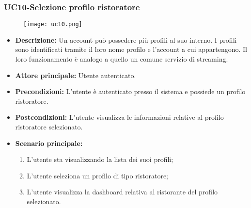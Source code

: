 \subsubsection{UC10-Selezione profilo ristoratore}
\begin{figure}[h] \texttt{[image: uc10.png]} \end{figure}
\begin{itemize}
\item \textbf{Descrizione:} Un account può possedere più profili al suo interno. I profili sono identificati tramite il loro nome profilo e l'account a cui appartengono. Il loro funzionamento è analogo a quello un comune servizio di streaming. %
\item \textbf{Attore principale:} Utente autenticato.
\item \textbf{Precondizioni:} L'utente è autenticato presso il sistema e possiede un profilo ristoratore.
\item \textbf{Postcondizioni:} L'utente visualizza le informazioni relative al profilo ristoratore selezionato.
\item \textbf{Scenario principale:}
\begin{enumerate}
    \item L'utente sta visualizzando la lista dei suoi profili;
    \item L'utente seleziona un profilo di tipo ristoratore;
    \item L'utente visualizza la dashboard relativa al ristorante del profilo selezionato.
\end{enumerate}
\end{itemize}

